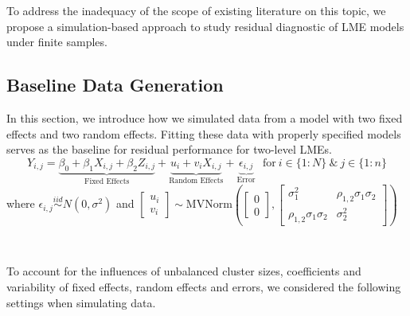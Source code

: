 \documentclass[12pt]{article}
\begin{document}
To address the inadequacy of the scope of existing literature on this
topic, we propose a simulation-based approach to study residual
diagnostic of LME models under finite samples.

\subsection{Baseline Data Generation}

In this section, we introduce how we simulated data from a model with
two fixed effects and two random effects. Fitting these data with
properly specified models serves as the baseline for residual
performance for two-level LMEs.
\begin{equation} Y_{i,j} =  \underbrace{\beta_0 + \beta_1 X_{i,j} + \beta_2 Z_{i,j}}_\text{Fixed Effects} + \underbrace{u_i + v_i X_{i,j}}_\text{Random Effects}  + \underbrace{\epsilon_{i,j}}_\text{Error} \ \ \ \text{for} \ i \in \{ 1:N \} \ \& \ j \in \{ 1:n \} \end{equation}
where \(\epsilon_{i,j}\overset{iid}\sim N(0,\sigma^2)\) and
\(\begin{bmatrix} u_i\\v_i \end{bmatrix} \sim \text{MVNorm} \left( \begin{bmatrix} 0 \\ 0 \end{bmatrix},\begin{bmatrix} \sigma_1^2&\rho_{1,2}\sigma_1\sigma_2\\ \rho_{1,2}\sigma_1\sigma_2&\sigma_2^2\end{bmatrix} \right)\)

~

To account for the influences of unbalanced cluster sizes, coefficients
and variability of fixed effects, random effects and errors, we
considered the following settings when simulating data.
\end{document}
